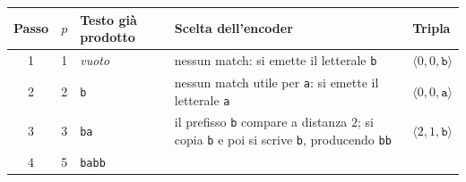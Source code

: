 \documentclass{article}
\theoremstyle{definition}
\numberwithin{equation}{section}
\begin{document}
\begin{center}
    \scriptsize
    \renewcommand{\arraystretch}{1.25}
    \begin{tabular}{|c|c|p{}|p{}|p{}|}
        \hline
        \textbf{Passo}                                                                                                                 & \textbf{$p$} & \textbf{Testo già prodotto}                   & \textbf{Scelta dell'encoder} & \textbf{Tripla} \\ \hline
        1                                                                                                                              & 1            & \emph{vuoto}                                  &
        nessun match: si emette il letterale \texttt{b}                                                                                &
        $\langle 0,0,\texttt{b}\rangle$                                                                                                                                                                                                                \\ \hline
        2                                                                                                                              & 2            & \texttt{b}                                    &
        nessun match utile per \texttt{a}: si emette il letterale \texttt{a}                                                           &
        $\langle 0,0,\texttt{a}\rangle$                                                                                                                                                                                                                \\ \hline
        3                                                                                                                              & 3            & \texttt{ba}                                   &
        il prefisso \texttt{b} compare a distanza $2$; si copia \texttt{b} e poi si scrive \texttt{b}, producendo \texttt{bb}          &
        $\langle 2,1,\texttt{b}\rangle$                                                                                                                                                                                                                \\ \hline
        4                                                                                                                              & 5            & \texttt{babb}                                 &

\end{tabular}
\end{center}
\end{document}
